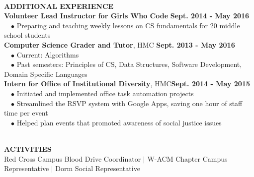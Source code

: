 \documentclass[11.5pt]{article}
\newcommand{\wrapTitle}[1]{{\sectionNL \textbf{\Large #1}} \sectionNL}
\newcommand{\vb}{ $\mid$ }
\newcommand{\sectionNL}{~\\[1pt]}
\newcommand{\customtab}{$\hspace{10pt} \bullet \hspace{2pt}$}
\newcommand{\customtabinline}{$\hspace{23pt}$}
\newcommand{\HMC}{HMC}
\newcommand{\rightAlign}{\hfill}
\begin{document}
\begin{flushleft}
\wrapTitle{ADDITIONAL EXPERIENCE}
\textbf{Volunteer Lead Instructor for Girls Who Code} \rightAlign \textbf{Sept. 2014 - May 2016} \\ 
\customtab Preparing and teaching weekly lessons on CS fundamentals for 20 middle school students\\
\textbf{Computer Science Grader and Tutor}, \HMC \rightAlign\textbf{ Sept. 2013 - May 2016} \\ 
\customtab Current: Algorithms \\
\customtab Past semesters: Principles of CS, Data Structures, Software Development, Domain Specific Languages \\
\textbf{Intern for Office of Institutional Diversity}, \HMC \rightAlign \textbf{Sept. 2014 - May 2015} \\
\customtab Initiated and implemented office task automation projects\\
\customtab Streamlined the RSVP system with Google Apps, saving one hour of staff time per event  \\
\customtab Helped plan events that promoted awareness of social justice issues \\





\end{flushleft}


\begin{flushleft}
\wrapTitle{ACTIVITIES}
\normalsize
 Red Cross Campus Blood Drive  Coordinator
 \vb W-ACM Chapter Campus Representative
 \vb Dorm Social Representative
\end{flushleft}

\end{document}
